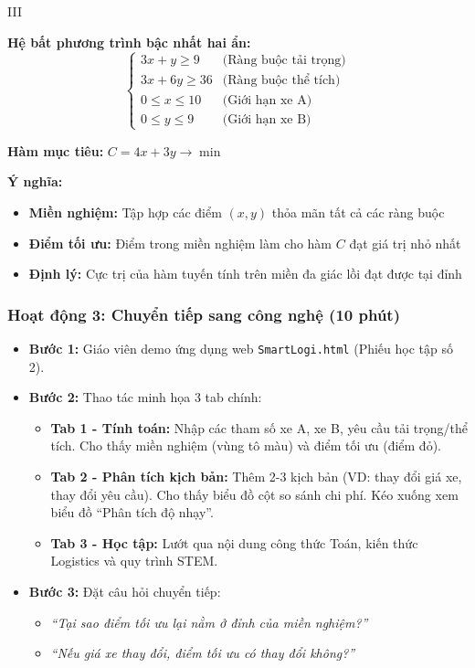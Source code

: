 \documentclass[12pt,a4paper]{article}
\begin{document}
\begin{competitionsection}{III}
\begin{keyformula}
\textbf{Hệ bất phương trình bậc nhất hai ẩn:}
$$\begin{cases}
3x + y \ge 9 & \text{(Ràng buộc tải trọng)} \\
3x + 6y \ge 36 & \text{(Ràng buộc thể tích)} \\
0 \le x \le 10 & \text{(Giới hạn xe A)} \\
0 \le y \le 9 & \text{(Giới hạn xe B)}
\end{cases}$$

\textbf{Hàm mục tiêu:} $C = 4x + 3y \to \min$

\textbf{Ý nghĩa:}
\begin{itemize}[leftmargin=*,noitemsep]
\item \textbf{Miền nghiệm:} Tập hợp các điểm $(x, y)$ thỏa mãn tất cả các ràng buộc
\item \textbf{Điểm tối ưu:} Điểm trong miền nghiệm làm cho hàm $C$ đạt giá trị nhỏ nhất
\item \textbf{Định lý:} Cực trị của hàm tuyến tính trên miền đa giác lồi đạt được tại đỉnh
\end{itemize}
\end{keyformula}

\subsubsection*{Hoạt động 3: Chuyển tiếp sang công nghệ (10 phút)}
\begin{itemize}[leftmargin=*,noitemsep]
\item \textbf{Bước 1:} Giáo viên demo ứng dụng web \texttt{SmartLogi.html} (Phiếu học tập số 2).
\item \textbf{Bước 2:} Thao tác minh họa 3 tab chính:
    \begin{itemize}
    \item \textbf{Tab 1 - Tính toán:} Nhập các tham số xe A, xe B, yêu cầu tải trọng/thể tích. Cho thấy miền nghiệm (vùng tô màu) và điểm tối ưu (điểm đỏ).
    \item \textbf{Tab 2 - Phân tích kịch bản:} Thêm 2-3 kịch bản (VD: thay đổi giá xe, thay đổi yêu cầu). Cho thấy biểu đồ cột so sánh chi phí. Kéo xuống xem biểu đồ ``Phân tích độ nhạy''.
    \item \textbf{Tab 3 - Học tập:} Lướt qua nội dung công thức Toán, kiến thức Logistics và quy trình STEM.
    \end{itemize}
\item \textbf{Bước 3:} Đặt câu hỏi chuyển tiếp:
    \begin{itemize}
    \item \textit{``Tại sao điểm tối ưu lại nằm ở đỉnh của miền nghiệm?''}
    \item \textit{``Nếu giá xe thay đổi, điểm tối ưu có thay đổi không?''}
    \end{itemize}
\end{itemize}


\end{competitionsection}
\end{document}
